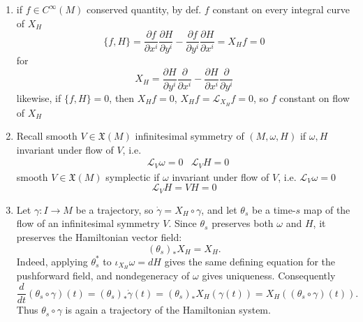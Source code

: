 \documentclass[11pt]{amsart}
\theoremstyle{definition}
\begin{document}
\begin{enumerate}
\item[(a)] if $f\in C^{\infty}(M)$ conserved quantity, by def. $f$ constant on every integral curve of $X_H$
\[
\lbrace f,H\rbrace = \frac{ \partial f}{ \partial x^i} \frac{ \partial H}{ \partial y^i} - \frac{ \partial f}{ \partial y^i} \frac{ \partial H}{ \partial x^i} = X_H f = 0
\]
for
\[
X_H = \frac{ \partial H}{ \partial y^i} \frac{ \partial }{ \partial x^i} - \frac{ \partial H}{ \partial x^i} \frac{ \partial }{ \partial y^i}
\]
likewise, if $\lbrace f,H \rbrace =0$, then $X_Hf =0$, $X_Hf = \mathcal{L}_{X_H} f= 0 $, so $f$ constant on flow of $X_H$
\item[(b)] Recall smooth $V \in \mathfrak{X}(M)$ infinitesimal symmetry of $(M,\omega,H)$ if $\omega, H$ invariant under flow of $V$, i.e.
\[
\begin{aligned}
  & \mathcal{L}_V \omega =0
  &  \mathcal{L}_VH = 0
\end{aligned}
\]
smooth $V\in \mathfrak{X}(M)$ symplectic if $\omega$ invariant under flow of $V$, i.e. $\mathcal{L}_V\omega =0$
\[
\mathcal{L}_VH = VH = 0
\]
\item[(c)] Let $\gamma:I\to M$ be a trajectory, so
$\dot\gamma=X_H\circ\gamma$, and let $\theta_s$ be a time-$s$ map of
the flow of an infinitesimal symmetry $V$.  Since $\theta_s$ preserves
both $\omega$ and $H$, it preserves the Hamiltonian vector field:
\[
  (\theta_s)_*X_H=X_H.
\]
Indeed, applying $\theta_s^*$ to
$\iota_{X_H}\omega=dH$ gives the same defining equation for the
pushforward field, and nondegeneracy of $\omega$ gives uniqueness.
Consequently
\[
 \frac{d}{dt}(\theta_s\circ\gamma)(t)
   =(\theta_s)_*\dot\gamma(t)
   =(\theta_s)_*X_H(\gamma(t))
   =X_H((\theta_s\circ\gamma)(t)).
\]
Thus $\theta_s\circ\gamma$ is again a trajectory of the Hamiltonian
system.
\end{enumerate}
\end{document}
